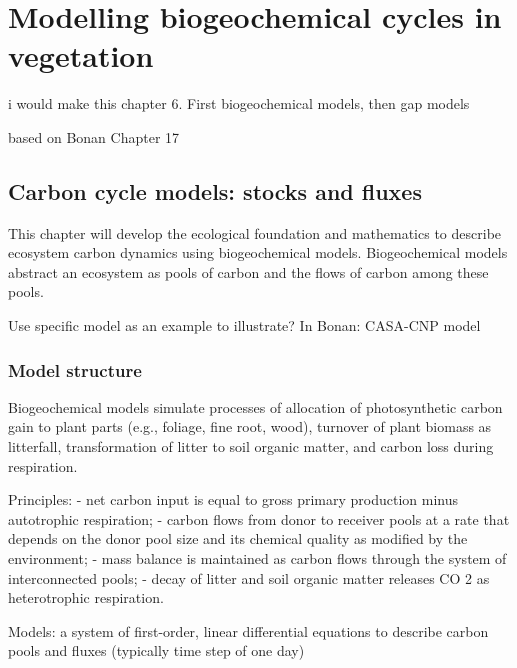 \documentclass[
  oneside]{book}
\begin{document}
\hypertarget{modelling-biogeochemical-cycles-in-vegetation}{%
\chapter{Modelling biogeochemical cycles in vegetation}\label{modelling-biogeochemical-cycles-in-vegetation}}


i would make this chapter 6. First biogeochemical models, then gap models

based on Bonan Chapter 17

\hypertarget{carbon-cycle-models-stocks-and-fluxes}{%
\section{Carbon cycle models: stocks and fluxes}\label{carbon-cycle-models-stocks-and-fluxes}}

This chapter will develop the ecological foundation and mathematics to describe ecosystem carbon dynamics using biogeochemical models.
Biogeochemical models abstract an ecosystem as pools of carbon and the flows of carbon among these pools.

Use specific model as an example to illustrate? In Bonan: CASA-CNP model

\hypertarget{model-structure}{%
\subsection{Model structure}\label{model-structure}}

Biogeochemical models simulate processes of allocation of photosynthetic carbon gain to plant parts (e.g., foliage, fine root, wood), turnover of plant biomass as litterfall, transformation of litter to soil organic matter, and carbon loss during respiration.

Principles:
- net carbon input is equal to gross primary production minus autotrophic respiration;
- carbon flows from donor to receiver pools at a rate that depends on the donor pool size and its chemical quality as modified by the environment;
- mass balance is maintained as carbon flows through the system of interconnected pools;
- decay of litter and soil organic matter releases CO 2 as heterotrophic respiration.

Models:
a system of first-order, linear differential equations to describe carbon pools and fluxes (typically time step of one day)
\end{document}
